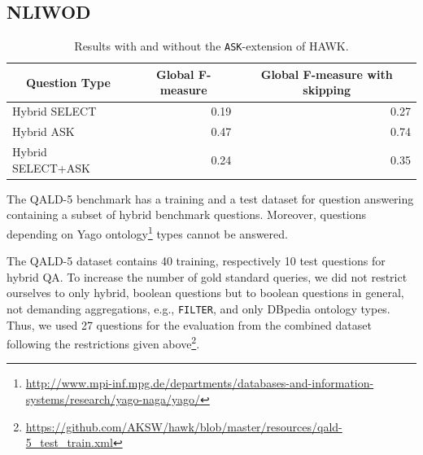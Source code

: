 

\subsection{NLIWOD}
\begin{table}[tb!]
\centering
\caption{Results with and without the \texttt{ASK}-extension of HAWK.}
\label{tab:eval_ask}
\begin{tabular}{@{}lrr@{}}
\toprule
\multicolumn{1}{c}{{\bf Question Type}} & \multicolumn{1}{c}{{\bf Global F-measure}} & \multicolumn{1}{c}{{\bf Global F-measure with skipping}} \\ \midrule
Hybrid SELECT                           & 0.19                                       & 0.27                                                     \\
Hybrid ASK                              & 0.47                                       & 0.74                                                     \\
Hybrid SELECT+ASK                       & 0.24                                       & 0.35                                                     \\ \bottomrule
\end{tabular}
\end{table}
The QALD-5 \cite{qald5} benchmark has a training and a test dataset for question answering containing a subset of hybrid benchmark questions.
Moreover, questions depending on Yago ontology\footnote{\url{http://www.mpi-inf.mpg.de/departments/databases-and-information-systems/research/yago-naga/yago/}} types cannot be answered.

The QALD-5 dataset contains 40 training, respectively 10 test questions for hybrid QA.
To increase the number of gold standard queries, we did not restrict ourselves to only hybrid, boolean questions but to boolean questions in general, not demanding aggregations, e.g., \texttt{FILTER}, and only DBpedia ontology types.
Thus, we used 27 questions for the evaluation from the combined dataset following the restrictions given above\footnote{\url{https://github.com/AKSW/hawk/blob/master/resources/qald-5_test_train.xml}}.



